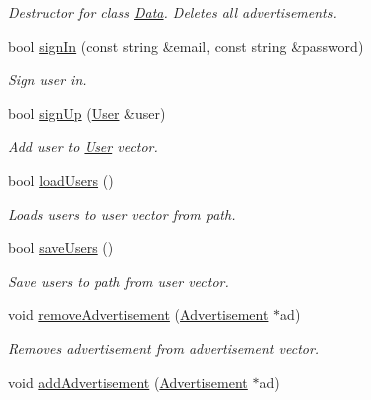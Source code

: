 \begin{DoxyCompactItemize}
\begin{DoxyCompactList}\small\item\em Destructor for class \hyperlink{class_data}{Data}. Deletes all advertisements. \end{DoxyCompactList}\item 
bool \hyperlink{class_data_a0dda2bc60741e1c196d2345035a95ee3}{sign\+In} (const string \&email, const string \&password)
\begin{DoxyCompactList}\small\item\em Sign user in. \end{DoxyCompactList}\item 
bool \hyperlink{class_data_a4e112b5666778df0c2e5020321c56e69}{sign\+Up} (\hyperlink{class_user}{User} \&user)
\begin{DoxyCompactList}\small\item\em Add user to \hyperlink{class_user}{User} vector. \end{DoxyCompactList}\item 
bool \hyperlink{class_data_af6bfff017e2428145e1f723c41f62e55}{load\+Users} ()
\begin{DoxyCompactList}\small\item\em Loads users to user vector from path. \end{DoxyCompactList}\item 
bool \hyperlink{class_data_aaf1fcf32ff1e5aab2dbdba338740ea41}{save\+Users} ()
\begin{DoxyCompactList}\small\item\em Save users to path from user vector. \end{DoxyCompactList}\item 
\hypertarget{class_data_ad8454797be5cf5326ab8627d89a9e208}{}void \hyperlink{class_data_ad8454797be5cf5326ab8627d89a9e208}{remove\+Advertisement} (\hyperlink{class_advertisement}{Advertisement} $\ast$ad)\label{class_data_ad8454797be5cf5326ab8627d89a9e208}

\begin{DoxyCompactList}\small\item\em Removes advertisement from advertisement vector. \end{DoxyCompactList}\item 
\hypertarget{class_data_ae4aa5295e124638182712d68416fc603}{}void \hyperlink{class_data_ae4aa5295e124638182712d68416fc603}{add\+Advertisement} (\hyperlink{class_advertisement}{Advertisement} $\ast$ad)\label{class_data_ae4aa5295e124638182712d68416fc603}


\end{DoxyCompactItemize}
